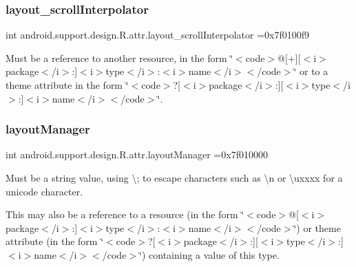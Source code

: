 \subsubsection{\texorpdfstring{layout\+\_\+scroll\+Interpolator}{layout\_scrollInterpolator}}
{\footnotesize\ttfamily int android.\+support.\+design.\+R.\+attr.\+layout\+\_\+scroll\+Interpolator =0x7f0100f9\hspace{0.3cm}{\ttfamily [static]}}

Must be a reference to another resource, in the form \char`\"{}$<$code$>$@\mbox{[}+\mbox{]}\mbox{[}$<$i$>$package$<$/i$>$\+:\mbox{]}$<$i$>$type$<$/i$>$\+:$<$i$>$name$<$/i$>$$<$/code$>$\char`\"{} or to a theme attribute in the form \char`\"{}$<$code$>$?\mbox{[}$<$i$>$package$<$/i$>$\+:\mbox{]}\mbox{[}$<$i$>$type$<$/i$>$\+:\mbox{]}$<$i$>$name$<$/i$>$$<$/code$>$\char`\"{}. \mbox{\label{classandroid_1_1support_1_1design_1_1R_1_1attr_aee29483605d29525a26ab9121d9b7225}} 
\subsubsection{\texorpdfstring{layout\+Manager}{layoutManager}}
{\footnotesize\ttfamily int android.\+support.\+design.\+R.\+attr.\+layout\+Manager =0x7f010000\hspace{0.3cm}{\ttfamily [static]}}

Must be a string value, using \textquotesingle{}\textbackslash{};\textquotesingle{} to escape characters such as \textquotesingle{}\textbackslash{}n\textquotesingle{} or \textquotesingle{}\textbackslash{}uxxxx\textquotesingle{} for a unicode character. 

This may also be a reference to a resource (in the form \char`\"{}$<$code$>$@\mbox{[}$<$i$>$package$<$/i$>$\+:\mbox{]}$<$i$>$type$<$/i$>$\+:$<$i$>$name$<$/i$>$$<$/code$>$\char`\"{}) or theme attribute (in the form \char`\"{}$<$code$>$?\mbox{[}$<$i$>$package$<$/i$>$\+:\mbox{]}\mbox{[}$<$i$>$type$<$/i$>$\+:\mbox{]}$<$i$>$name$<$/i$>$$<$/code$>$\char`\"{}) containing a value of this type. \mbox{\label{classandroid_1_1support_1_1design_1_1R_1_1attr_a95c2e375c8509ef7555a7d818d499bfd}} 
